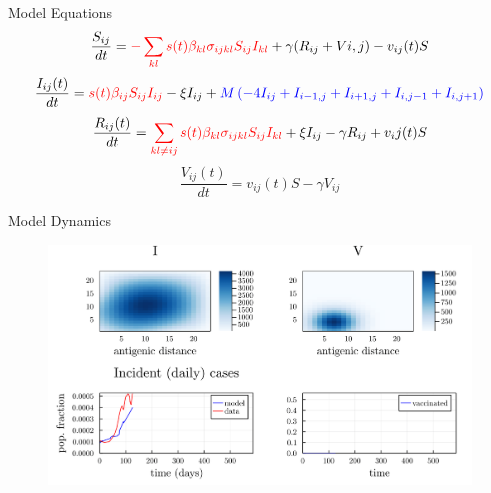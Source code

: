 \documentclass{beamer}
\begin{document}
\begin{frame}{Model Equations}
    \small
    \begin{equation}
        \frac{S_{ij}}{dt} = \textcolor{myred}{-\sum_{kl} s(t) \beta_{kl} \sigma_{ijkl} S_{ij} I_{kl}} + \gamma (R_{ij} + V{i,j})  - v_{ij}(t)S  \label{Seqn}
    \end{equation}
    \begin{equation}
        \frac{ I_{ij}(t)}{dt} = \textcolor{myred}{s(t) \beta_{ij} S_{ij} I_{ij}} - \xi I_{ij} + \textcolor{myblue}{M \left(- 4I_{ij} + I_{i-1,j}  + I_{i+1,j} + I_{i,j-1} + I_{i,j+1} \right)} \label{Ieqn}    
    \end{equation}
    \begin{equation}
        \frac{R_{ij}(t)}{dt} =  \textcolor{myred}{\sum_{kl \neq ij} s(t) \beta_{kl} \sigma_{ijkl} S_{ij} I_{kl}} + \xi I_{ij} - \gamma R_{ij} + v_ij(t)S \label{Reqn}
    \end{equation}
    \begin{equation}
    \frac{V_{ij}(t)}{dt} =  v_{ij}(t)S  - \gamma V_{ij}  \label{Veqn}
    \end{equation}
\end{frame}

\begin{frame}{Model Dynamics}
    \begin{figure} 
        \includegraphics[width=1.1\textwidth]{2022-07-12-01-13-30.png}
    \end{figure}
\end{frame}
\end{document}

